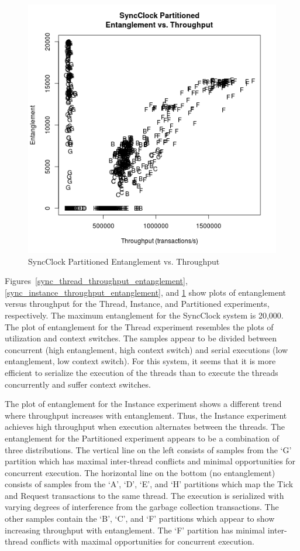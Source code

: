 \begin{figure}[H]
\center
\includegraphics[height=.4\textheight]{sync_partitioned_throughput_entanglement.png}
\caption{SyncClock Partitioned Entanglement vs. Throughput}
\label{sync_partitioned_throughput_entanglement}
\end{figure}

Figures~\ref{sync_thread_throughput_entanglement}, \ref{sync_instance_throughput_entanglement}, and \ref{sync_partitioned_throughput_entanglement} show plots of entanglement versus throughput for the Thread, Instance, and Partitioned experiments, respectively.
The maximum entanglement for the SyncClock system is 20,000.
The plot of entanglement for the Thread experiment resembles the plots of utilization and context switches.
The samples appear to be divided between concurrent (high entanglement, high context switch) and serial executions (low entanglement, low context switch).
For this system, it seems that it is more efficient to serialize the execution of the threads than to execute the threads concurrently and suffer context switches.

The plot of entanglement for the Instance experiment shows a different trend where throughput increases with entanglement.
Thus, the Instance experiment achieves high throughput when execution alternates between the threads.
The entanglement for the Partitioned experiment appears to be a combination of three distributions.
The vertical line on the left consists of samples from the `G' partition which has maximal inter-thread conflicts and minimal opportunities for concurrent execution.
The horizontal line on the bottom (no entanglement) consists of samples from the `A', `D', `E', and `H' partitions which map the Tick and Request transactions to the same thread.
The execution is serialized with varying degrees of interference from the garbage collection transactions.
The other samples contain the `B', `C', and `F' partitions which appear to show increasing throughput with entanglement.
The `F' partition has minimal inter-thread conflicts with maximal opportunities for concurrent execution.

